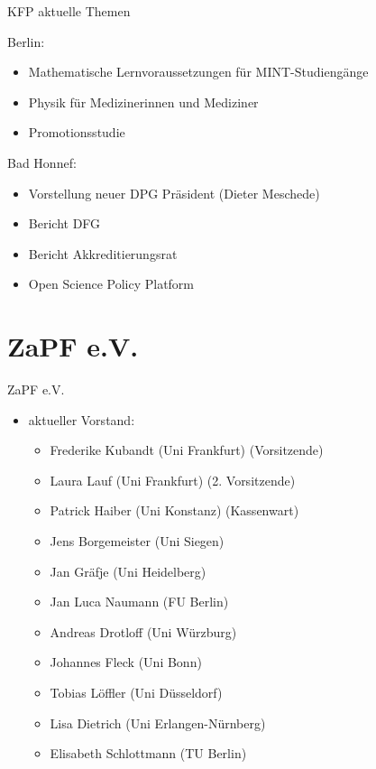 \documentclass[compress, aspectratio=169]{beamer}
\begin{document}
 
 \begin{frame}{KFP aktuelle Themen}
 
  Berlin:
  \begin{itemize}
   \item Mathematische Lernvoraussetzungen für MINT-Studiengänge
   \item Physik für Medizinerinnen und Mediziner
   \item Promotionsstudie
  \end{itemize}
  
  \bigskip
  
  Bad Honnef:
  \begin{itemize}
   \item Vorstellung neuer DPG Präsident (Dieter Meschede)
   \item Bericht DFG 
   \item Bericht Akkreditierungsrat 
   \item Open Science Policy Platform 
  \end{itemize}
 \end{frame}

\section{ZaPF e.V.}


\begin{frame}{ZaPF e.V.}       
    \begin{itemize}                         
        \item[] aktueller Vorstand:                           
        \begin{itemize}                          
             \item Frederike Kubandt (Uni Frankfurt) (Vorsitzende)                           
             \item Laura Lauf (Uni Frankfurt) (2. Vorsitzende)                           
             \item Patrick Haiber (Uni Konstanz) (Kassenwart)                           
             \item Jens Borgemeister (Uni Siegen)                           
             \item Jan Gräfje (Uni Heidelberg)                           
             \item Jan Luca Naumann (FU Berlin)                           
             \item Andreas Drotloff (Uni Würzburg)                           
             \item Johannes Fleck (Uni Bonn)
             \item Tobias Löffler (Uni Düsseldorf)                           
             \item Lisa Dietrich (Uni Erlangen-Nürnberg)                          
             \item Elisabeth Schlottmann (TU Berlin)
        \end{itemize}                         
    \end{itemize}                       
\end{frame}                        
                      
\end{document}

